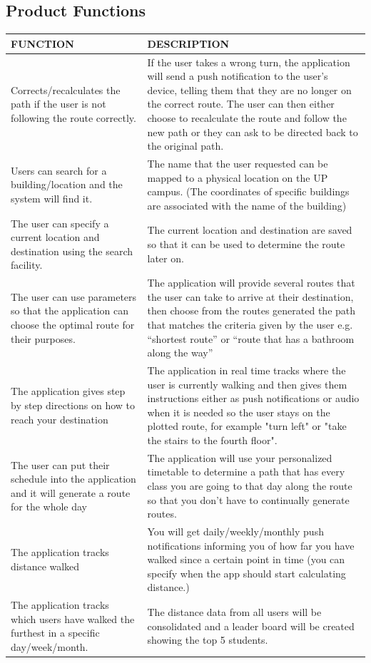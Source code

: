 \documentclass[a4paper,12pt]{article}
\begin{document}
\subsection{Product Functions}
\begin{table}[!htbp]
\centering
\footnotesize
\label{tab:table 2.2}
\bgroup
\def\arraystretch{1.3}
\begin{tabular}{|L|L|}
\hline
FUNCTION & DESCRIPTION 
\\
\hline
Corrects/recalculates the path if the user is not following the route correctly. & If the user takes a wrong turn, the application will send a push notification to the user’s device, telling them that they are no longer on the correct route. The user can then either choose to recalculate the route and follow the new path or they can ask to be directed back to the original path. 
\\
\hline
Users can search for a building/location and the system will find it. & The name that the user requested can be mapped to a physical location on the UP campus. (The coordinates of specific buildings are associated with the name of the building)
\\
\hline
The user can specify a current location and destination using the search facility. & The current location and destination are saved so that it can be used to determine the route later on. 
\\
\hline
The user can use parameters so that the application can choose the optimal route for their purposes. & The application will provide several routes that the user can take to arrive at their destination, then choose from the routes generated the path that matches the criteria given by the user e.g. “shortest route” or “route that has a bathroom along the way”
\\
\hline
The application gives step by step directions on how to reach your destination & The application in real time tracks where the user is currently walking and then gives them instructions either as push notifications or audio when it is needed so the user stays on the plotted route, for example "turn left" or "take the stairs to the fourth floor". 
\\
\hline
The user can put their schedule into the application and it will generate a route for the whole day & The application will use your personalized timetable to determine a path that has every class you are going to that day along the route so that you don’t have to continually generate routes.
\\
\hline
The application tracks distance walked & You will get daily/weekly/monthly push notifications informing you of how far you have walked since a certain point in time (you can specify when the app should start calculating distance.)
\\
\hline
The application tracks which users have walked the furthest in a specific day/week/month. & The distance data from all users will be consolidated and a leader board will be created showing the top 5 students.
\\
\hline	
\end{tabular}
\egroup	
\end{table}
\end{document}
